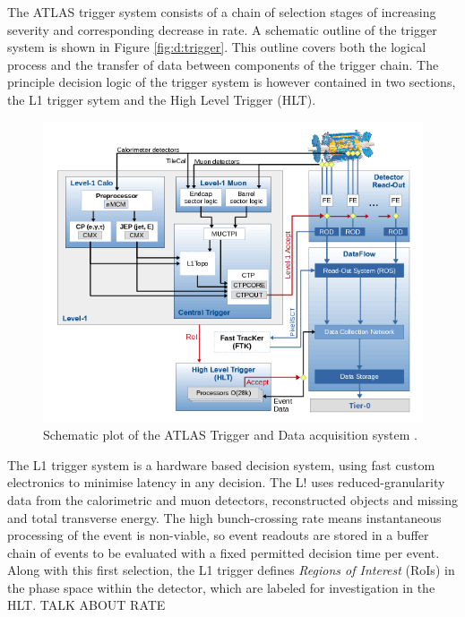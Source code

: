 	The ATLAS trigger system consists of a chain of selection stages of increasing severity and corresponding decrease in rate. A schematic outline of the trigger system is shown in Figure \ref{fig:d:trigger}. This outline covers both the logical process and the transfer of data between components of the trigger chain. The principle decision logic of the trigger system is however contained in two sections, the L1 trigger sytem and the High Level Trigger (HLT).

	\begin{figure}
		\centering
		\includegraphics[width=0.7\linewidth]{D/FIGS/trigschem}
		\caption{Schematic plot of the ATLAS Trigger and Data acquisition system \cite{trig2015}.}
		\label{fig:trigschem}
		\end{figure}

	The L1 trigger system \cite{L1} is a hardware based decision system, using fast custom electronics to minimise latency in any decision. The L! uses reduced-granularity data from the calorimetric and muon detectors, reconstructed objects and missing and total transverse energy. The high bunch-crossing rate means instantaneous processing of the event is non-viable, so event readouts are stored in a buffer chain of events to be evaluated with a fixed permitted decision time per event. Along with this first selection, the L1 trigger defines \textit{Regions of Interest} (RoIs) in the phase space within the detector, which are labeled for investigation in the HLT. TALK ABOUT RATE

